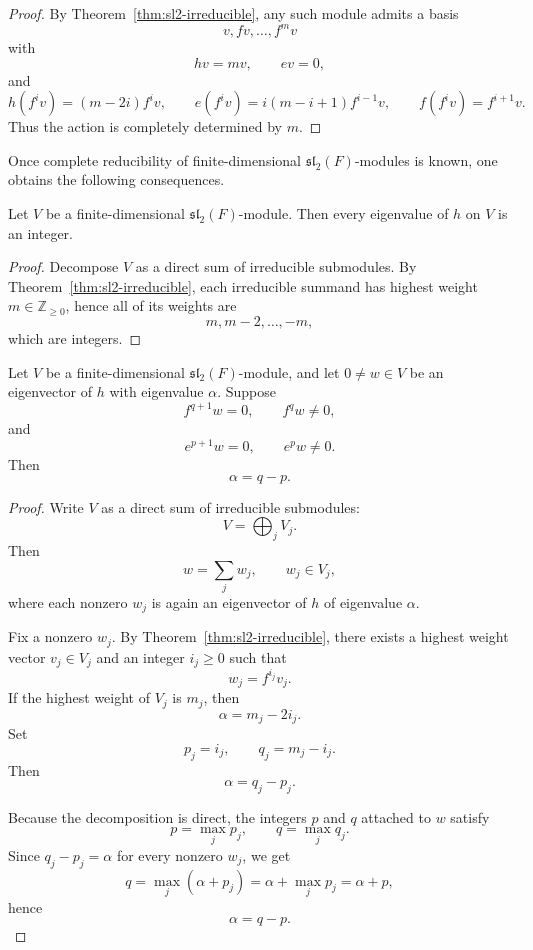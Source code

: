 \begin{proof}
    By Theorem~\ref{thm:sl2-irreducible}, any such module admits a basis
    \[
        v,fv,\dots,f^mv
    \]
    with
    \[
        hv=mv,\qquad ev=0,
    \]
    and
    \[
        h(f^iv)=(m-2i)f^iv,\qquad
        e(f^iv)=i(m-i+1)f^{i-1}v,\qquad
        f(f^iv)=f^{i+1}v.
    \]
    Thus the action is completely determined by \(m\).
\end{proof}

\begin{remark}
    Once complete reducibility of finite-dimensional \(\mathfrak{sl}_2(F)\)-modules is known, one obtains the following consequences.
\end{remark}

\begin{corollary}\label{cor:h-integral}
    Let \(V\) be a finite-dimensional \(\mathfrak{sl}_2(F)\)-module. Then every eigenvalue of \(h\) on \(V\) is an integer.
\end{corollary}

\begin{proof}
    Decompose \(V\) as a direct sum of irreducible submodules. By Theorem~\ref{thm:sl2-irreducible}, each irreducible summand has highest weight \(m\in\mathbb Z_{\ge0}\), hence all of its weights are
    \[
        m,m-2,\dots,-m,
    \]
    which are integers.
\end{proof}

\begin{proposition}\label{prop:weight-q-minus-p}
    Let \(V\) be a finite-dimensional \(\mathfrak{sl}_2(F)\)-module, and let \(0\neq w\in V\) be an eigenvector of \(h\) with eigenvalue \(\alpha\). Suppose
    \[
        f^{q+1}w=0,\qquad f^qw\neq 0,
    \]
    and
    \[
        e^{p+1}w=0,\qquad e^pw\neq 0.
    \]
    Then
    \[
        \alpha=q-p.
    \]
\end{proposition}

\begin{proof}
    Write \(V\) as a direct sum of irreducible submodules:
    \[
        V=\bigoplus_j V_j.
    \]
    Then
    \[
        w=\sum_j w_j,\qquad w_j\in V_j,
    \]
    where each nonzero \(w_j\) is again an eigenvector of \(h\) of eigenvalue \(\alpha\).

    Fix a nonzero \(w_j\). By Theorem~\ref{thm:sl2-irreducible}, there exists a highest weight vector \(v_j\in V_j\) and an integer \(i_j\ge 0\) such that
    \[
        w_j=f^{i_j}v_j.
    \]
    If the highest weight of \(V_j\) is \(m_j\), then
    \[
        \alpha=m_j-2i_j.
    \]
    Set
    \[
        p_j=i_j,\qquad q_j=m_j-i_j.
    \]
    Then
    \[
        \alpha=q_j-p_j.
    \]

    Because the decomposition is direct, the integers \(p\) and \(q\) attached to \(w\) satisfy
    \[
        p=\max_j p_j,\qquad q=\max_j q_j.
    \]
    Since \(q_j-p_j=\alpha\) for every nonzero \(w_j\), we get
    \[
        q=\max_j(\alpha+p_j)=\alpha+\max_j p_j=\alpha+p,
    \]
    hence
    \[
        \alpha=q-p.
    \]
\end{proof}

